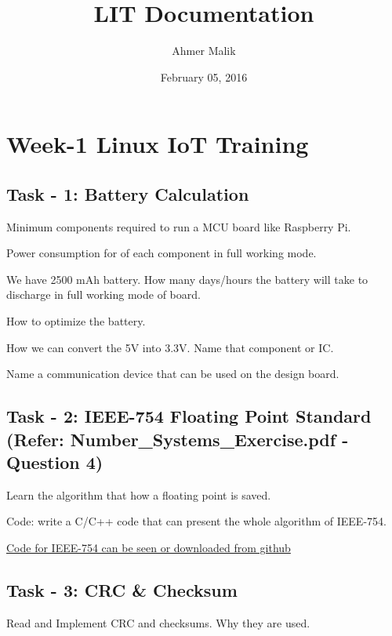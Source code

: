 \documentclass[letterpaper,10pt,english]{sphinxmanual}
\title{LIT Documentation}
\date{February 05, 2016}
\author{Ahmer Malik}
\begin{document}
\maketitle
\tableofcontents
{}\label{index::doc}



\chapter{Week-1 Linux IoT Training}
\label{week-01:user-guide-linuxiot-training}\label{week-01::doc}\label{week-01:week-1-linux-iot-training}\label{week-01:week-01}

\section{Task - 1: Battery Calculation}
\label{week-01:task-1-battery-calculation}
Minimum components required to run a MCU board like Raspberry Pi.

Power consumption for of each component in full working mode.

We have 2500 mAh battery. How many days/hours the battery will take to discharge in full working mode of board.

How to optimize the battery.

How we can convert the 5V into 3.3V. Name that component or IC.

Name a communication device that can be used on the design board.


\section{Task - 2: IEEE-754  Floating Point Standard (Refer: Number\_Systems\_Exercise.pdf -Question 4)}
\label{week-01:task-2-ieee-754-floating-point-standard-refer-number-systems-exercise-pdf-question-4}
Learn the algorithm that how a floating point is saved.

Code: write a C/C++ code that can present the whole algorithm of IEEE-754.

\href{https://github.com/Ahmer-444/personal-repo/blob/master/IEEE-754.c}{Code for IEEE-754 can be seen or downloaded from github}


\section{Task - 3: CRC \& Checksum}
\label{week-01:task-3-crc-checksum}
Read and Implement CRC and checksums. Why they are used.
\end{document}
